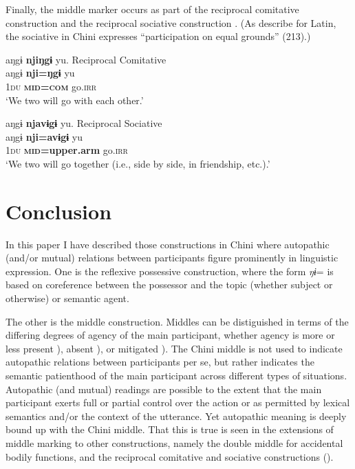 \documentclass[output=paper]{langscibook}
\begin{document}
Finally, the middle marker occurs as part of the reciprocal comitative construction  and the reciprocal sociative construction . (As \citet{ZaliznjakShmelev2007} describe for Latin, the sociative in Chini expresses “participation on equal grounds” (213).)

\ea\label{ex:brooks:36}
\glll aŋgɨ  \textbf{njiŋgɨ}   yu.  \textup{Reciprocal Comitative}\\
aŋgɨ  \textbf{nji=ŋgɨ}  yu\\
\textsc{1du}  \textbf{\textsc{mid=com}}  go.\textsc{irr}  \\
\glt `We two will go with each other.'
\z

\ea\label{ex:brooks:37}
\glll aŋgɨ  \textbf{njavɨgɨ}   yu. \textup{Reciprocal Sociative} \\
aŋgɨ  \textbf{nji=avɨgɨ}   yu\\
\textsc{1du}  \textbf{\textsc{mid}}\textbf{=upper.arm}  go\textsc{.irr}  \\
 \glt `We two will go together (i.e., side by side, in friendship, etc.).'
 \z

\section{{Conclusion}}\label{sec:brooks:5}

In this paper I have described those constructions in Chini where autopathic (and/or mutual) relations between participants figure prominently in linguistic expression. One is the reflexive possessive construction, where the form \textit{ŋɨ}= is based on coreference between the possessor and the topic (whether subject or otherwise) or semantic agent.

The other is the middle construction. Middles can be distiguished in terms of the differing degrees of agency of the main participant, whether agency is more or less present ), absent ), or mitigated ). The Chini middle is not used to indicate autopathic relations between participants per se, but rather indicates the semantic patienthood of the main participant across different types of situations. Autopathic (and mutual) readings are possible to the extent that the main participant exerts full or partial control over the action or as permitted by lexical semantics and/or the context of the utterance. Yet autopathic meaning is deeply bound up with the Chini middle. That this is true is seen in the extensions of middle marking to other constructions, namely the double middle for accidental bodily functions, and the reciprocal comitative and sociative constructions ().
\end{document}
